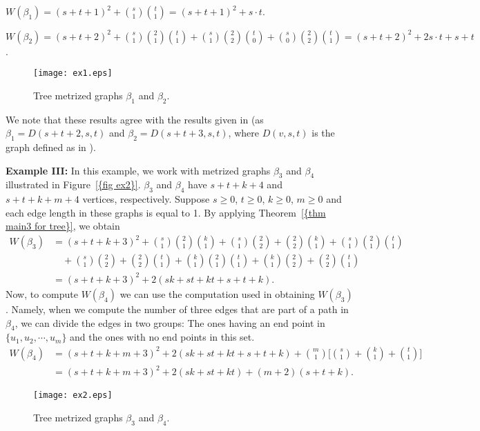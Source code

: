 \documentclass[12pt]{amsart}
\theoremstyle{example}
\theoremstyle{definition}
\theoremstyle{notation}
\begin{document}
$W(\beta_1)=(s+t+1)^2+\binom{s}{1} \binom{t}{1}=(s+t+1)^2+s\cdot t$.

$W(\beta_2)=(s+t+2)^2+\binom{s}{1} \binom{2}{1} \binom{t}{1}+\binom{s}{1} \binom{2}{2} \binom{t}{0}+\binom{s}{0} \binom{2}{2} \binom{t}{1}=(s+t+2)^2+2s\cdot t+s+t$.
\begin{figure}
\centering
\texttt{[image: ex1.eps]} \caption{Tree metrized graphs $\beta_1$ and $\beta_2$.} \label{fig ex1}
\end{figure}

We note that these results agree with the results given in \cite[page 234]{DEG} (as $\beta_1=D(s+t+2,s,t)$ and $\beta_2=D(s+t+3,s,t)$, where $D(v,s,t)$ is the graph defined as in \cite[page 234]{DEG}).

\textbf{Example III:}
In this example, we work with metrized graphs $\beta_3$ and $\beta_4$ illustrated in  {Figure~\ref{{fig ex2}}}. $\beta_3$ and $\beta_4$ have $s+t+k+4$ and $s+t+k+m+4$ vertices, respectively. Suppose $s \geq 0$, $t \geq 0$, $k \geq 0$, $m \geq 0$ and each edge length in these graphs is equal to 1. By applying {Theorem~\ref{{thm main3 for tree}}}, we obtain
\begin{equation*}
\begin{split}
W(\beta_3)&=(s+t+k+3)^2+\binom{s}{1} \binom{2}{1} \binom{k}{1}+\binom{s}{1} \binom{2}{2} + \binom{2}{2} \binom{k}{1}
+\binom{s}{1} \binom{2}{1} \binom{t}{1}\\
&\quad +\binom{s}{1} \binom{2}{2} +  \binom{2}{2} \binom{t}{1} +\binom{k}{1} \binom{2}{1} \binom{t}{1}+\binom{k}{1} \binom{2}{2} + \binom{2}{2} \binom{t}{1}\\
&=(s+t+k+3)^2+2(sk+st+kt+s+t+k).
\end{split}
\end{equation*}
Now, to compute $W(\beta_4)$ we can use the computation used in obtaining $W(\beta_3)$. Namely, when we compute the number of three edges that are part of a path in $\beta_4$,  we can divide the edges in two groups: The ones having an end point in $\{ u_1, u_2, \cdots, u_m \}$
and the ones with no end points in this set.
\begin{equation*}
\begin{split}
W(\beta_4)&=(s+t+k+m+3)^2+2(sk+st+kt+s+t+k)+\binom{m}{1} \Big[ \binom{s}{1} + \binom{k}{1}+ \binom{t}{1} \Big]\\
&=(s+t+k+m+3)^2+2(sk+st+kt)+(m+2)(s+t+k).
\end{split}
\end{equation*}

\begin{figure}
\centering
\texttt{[image: ex2.eps]} \caption{Tree metrized graphs $\beta_3$ and $\beta_4$.} \label{fig ex2}
\end{figure}
\end{document}
